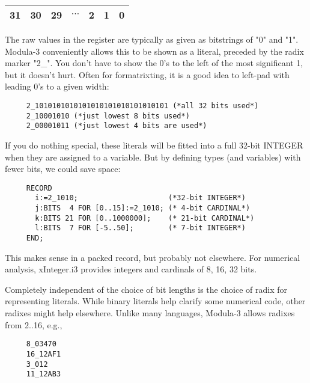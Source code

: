 \begin{center}
\begin{tabular}{|c|c|c|c|c|c|c|} \hline
    31 & 30 & 29 & $\cdots$ & 2 & 1 & 0 \\ \hline
\end{tabular}    
\end{center}

The raw values in the register are typically as given as
bitstrings of "0" and "1".  Modula-3 conveniently allows
this to be shown as a literal, preceded by the radix marker
"2\_".  You don't have to show the 0's to the left of the
most significant 1, but it doesn't hurt.  Often for
formatrixting, it is a good idea to left-pad with leading 0's
to a given width:

\begin{tt} \begin{verbatim}
     2_1010101010101010101010101010101 (*all 32 bits used*)
     2_10001010 (*just lowest 8 bits used*)
     2_00001011 (*just lowest 4 bits are used*)
\end{verbatim} \end{tt}

If you do nothing special, these literals will be fitted
into a full 32-bit INTEGER when they are assigned to a
variable.  But by defining types (and variables) with fewer
bits, we could save space:

\begin{tt} \begin{verbatim}
     RECORD
       i:=2_1010;                     (*32-bit INTEGER*)
       j:BITS  4 FOR [0..15]:=2_1010; (* 4-bit CARDINAL*)
       k:BITS 21 FOR [0..1000000];    (* 21-bit CARDINAL*)
       l:BITS  7 FOR [-5..50];        (* 7-bit INTEGER*)
     END;
\end{verbatim} \end{tt}

This makes sense in a packed record, but probably not
elsewhere.  For numerical analysis, xInteger.i3 provides integers
and cardinals of 8, 16, 32 bits.

Completely independent of the choice of bit lengths is the
choice of radix for representing literals.  While binary
literals help clarify some numerical code, other radixes
might help elsewhere.  Unlike many languages, Modula-3
allows radixes from 2..16, e.g.,
\begin{tt} \begin{verbatim}
     8_03470
     16_12AF1
     3_012
     11_12AB3
\end{verbatim} \end{tt}

